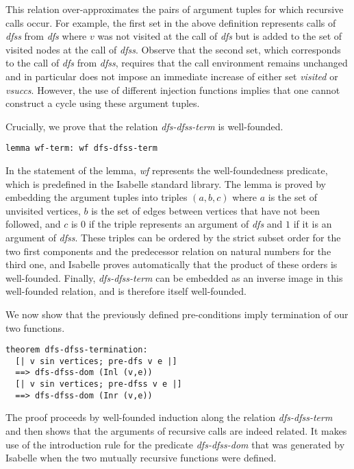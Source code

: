 \documentclass[sigplan,10pt,anonymous,review]{acmart}
\newcommand{\prog}[1]{\textit{#1}}
\begin{document}
This relation over-approximates the pairs of argument tuples for which recursive calls occur. For example, the first set in the above definition represents calls of \prog{dfss} from \prog{dfs} where $v$ was not visited at the call of \prog{dfs} but is added to the set of visited nodes at the call of \prog{dfss}. Observe that the second set, which corresponds to the call of \prog{dfs} from \prog{dfss}, requires that the call environment remains unchanged and in particular does not impose an immediate increase of either set \prog{visited} or \prog{vsuccs}. However, the use of different injection functions implies that one cannot construct a cycle using these argument tuples.

Crucially, we prove that the relation \prog{dfs-dfss-term} is well-founded.

\begin{small}
\begin{lstlisting}[language=isabelle]
lemma wf-term: wf dfs-dfss-term
\end{lstlisting}
\end{small}

In the statement of the lemma, \prog{wf} represents the well-foundedness predicate, which is predefined in the Isabelle standard library. The lemma is proved by embedding the argument tuples into triples $(a,b,c)$ where $a$ is the set of unvisited vertices, $b$ is the set of edges between vertices that have not been followed, and $c$ is $0$ if the triple represents an argument of \prog{dfs} and $1$ if it is an argument of \prog{dfss}. These triples can be ordered by the strict subset order for the two first components and the predecessor relation on natural numbers for the third one, and Isabelle proves automatically that the product of these orders is well-founded. Finally, \prog{dfs-dfss-term} can be embedded as an inverse image in this well-founded relation, and is therefore itself well-founded.

We now show that the previously defined pre-conditions imply termination of our two functions.

\begin{small}
\begin{lstlisting}[language=isabelle]
theorem dfs-dfss-termination:
  [| v sin vertices; pre-dfs v e |] 
  ==> dfs-dfss-dom (Inl (v,e))
  [| v sin vertices; pre-dfss v e |] 
  ==> dfs-dfss-dom (Inr (v,e))
\end{lstlisting}
\end{small}

The proof proceeds by well-founded induction along the relation \prog{dfs-dfss-term} and then shows that the arguments of recursive calls are indeed related. It makes use of the introduction rule for the predicate \prog{dfs-dfss-dom} that was generated by Isabelle when the two mutually recursive functions were defined.
\end{document}
